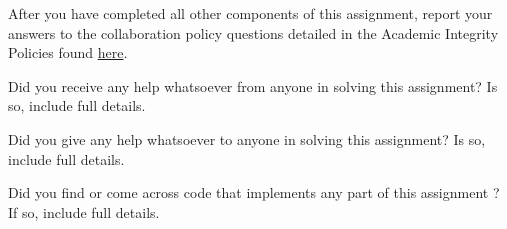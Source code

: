 \begin{questions}
    \begin{tcolorbox}[fit,height=13cm, width=15cm, blank, borderline={1pt}{-2pt},nobeforeafter]
    \end{tcolorbox}
    

    
    
    \clearpage
    \question After you have completed all other components of this assignment, report your answers to the collaboration policy questions detailed in the Academic Integrity Policies found \href{http://www.cs.cmu.edu/~mgormley/courses/10601bd-f18/about.html#7-academic-integrity-policies}{here}.
    \begin{enumerate*}
        \item Did you receive any help whatsoever from anyone in solving this assignment? Is so, include full details.
        \item Did you give any help whatsoever to anyone in solving this assignment? Is so, include full details.
        \item Did you find or come across code that implements any part of this assignment ? If so, include full details.
    \end{enumerate*}
    
    \begin{tcolorbox}[fit,height=19cm, width=15cm, blank, borderline={1pt}{-2pt},nobeforeafter]
    \end{tcolorbox}
    
\end{questions}

